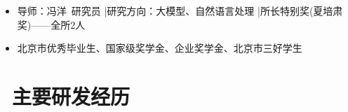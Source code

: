 \documentclass{resume}
\begin{document}
\vspace{-0.5mm}
\begin{itemize}[parsep=0.3ex]
  \item 导师：冯洋\ 研究员 \quad|\quad 研究方向：大模型、自然语言处理 \quad|\quad 所长特别奖(夏培肃奖)——全所2人 
\end{itemize}


\vspace{-0.5mm}
\begin{itemize}[parsep=0.3ex]
  \item 北京市优秀毕业生、国家级奖学金、企业奖学金、北京市三好学生
\end{itemize}


\section{\textcolor{red1}{\faCogs\ 主要研发经历}}


\end{document}
